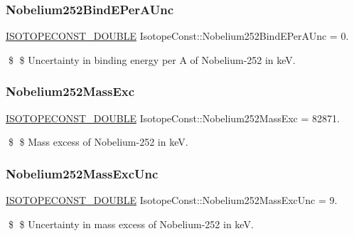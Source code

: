 \subsubsection{\texorpdfstring{Nobelium252\+Bind\+E\+Per\+A\+Unc}{Nobelium252BindEPerAUnc}}
{\footnotesize\ttfamily \mbox{\hyperlink{group___isotope_const-_macros_ga8f45a7272ce02c0b4c65c44636ed719a}{I\+S\+O\+T\+O\+P\+E\+C\+O\+N\+S\+T\+\_\+\+D\+O\+U\+B\+LE}} Isotope\+Const\+::\+Nobelium252\+Bind\+E\+Per\+A\+Unc = 0.}

\$ \$ Uncertainty in binding energy per A of Nobelium-\/252 in keV. \mbox{\label{group___isotope_const-_nobelium-_no252_gacd26c83107e8e4744e411dfc950d3c0e}} 
\subsubsection{\texorpdfstring{Nobelium252\+Mass\+Exc}{Nobelium252MassExc}}
{\footnotesize\ttfamily \mbox{\hyperlink{group___isotope_const-_macros_ga8f45a7272ce02c0b4c65c44636ed719a}{I\+S\+O\+T\+O\+P\+E\+C\+O\+N\+S\+T\+\_\+\+D\+O\+U\+B\+LE}} Isotope\+Const\+::\+Nobelium252\+Mass\+Exc = 82871.}

\$ \$ Mass excess of Nobelium-\/252 in keV. \mbox{\label{group___isotope_const-_nobelium-_no252_ga3b16168a982264924c8e7dcf30ab726f}} 
\subsubsection{\texorpdfstring{Nobelium252\+Mass\+Exc\+Unc}{Nobelium252MassExcUnc}}
{\footnotesize\ttfamily \mbox{\hyperlink{group___isotope_const-_macros_ga8f45a7272ce02c0b4c65c44636ed719a}{I\+S\+O\+T\+O\+P\+E\+C\+O\+N\+S\+T\+\_\+\+D\+O\+U\+B\+LE}} Isotope\+Const\+::\+Nobelium252\+Mass\+Exc\+Unc = 9.}

\$ \$ Uncertainty in mass excess of Nobelium-\/252 in keV. \mbox{\label{group___isotope_const-_nobelium-_no252_ga81bacd24542fe0016b98fc4bee3a9186}} 
